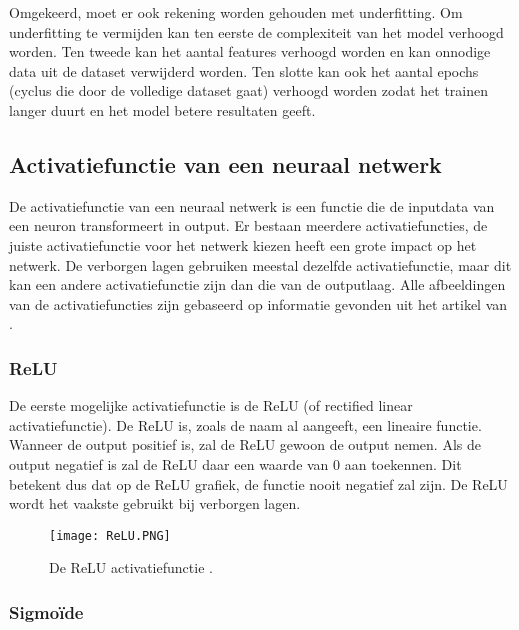 Omgekeerd, moet er ook rekening worden gehouden met underfitting. Om underfitting te vermijden kan ten eerste de complexiteit van het model verhoogd worden. Ten tweede kan het aantal features verhoogd worden en kan onnodige data uit de dataset verwijderd worden. Ten slotte kan ook het aantal epochs (cyclus die door de volledige dataset gaat) verhoogd worden zodat het trainen langer duurt en het model betere resultaten geeft. \autocite{GeeksforGeeks2020}

\subsection{Activatiefunctie van een neuraal netwerk}
\label{sec:activatiefunctie}

De activatiefunctie van een neuraal netwerk is een functie die de inputdata van een neuron transformeert in output. Er bestaan meerdere activatiefuncties, de juiste activatiefunctie voor het netwerk kiezen heeft een grote impact op het netwerk. De verborgen lagen gebruiken meestal dezelfde activatiefunctie, maar dit kan een andere activatiefunctie zijn dan die van de outputlaag. Alle afbeeldingen van de activatiefuncties zijn gebaseerd op informatie gevonden uit het artikel van \textcite{Brownlee2021}. 

\subsubsection{ReLU}
\label{sec:ReLU}

De eerste mogelijke activatiefunctie is de ReLU (of rectified linear activatiefunctie). De ReLU is, zoals de naam al aangeeft, een lineaire functie. Wanneer de output positief is, zal de ReLU gewoon de output nemen. Als de output negatief is zal de ReLU daar een waarde van 0 aan toekennen. Dit betekent dus dat op de ReLU grafiek, de functie nooit negatief zal zijn. De ReLU wordt het vaakste gebruikt bij verborgen lagen. \autocite{Brownlee2021}

\begin{figure}[!htbp]
    \texttt{[image: ReLU.PNG]}
    \caption{\label{ReLU}De ReLU activatiefunctie \autocite{Brownlee2021}.}
\end{figure}
\FloatBarrier


\subsubsection{Sigmoïde}
\label{sec:sigmoide}

